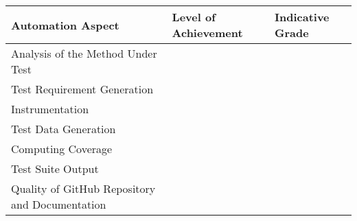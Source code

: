 \begin{tabular}{p{10em}p{15em}p{5em}}

    \toprule

    {\bf Automation Aspect} & {\bf Level of Achievement} & {\bf Indicative Grade} \\

    \midrule

    Analysis of the Method Under Test \\

    \midrule

    Test Requirement Generation \\

    \midrule

    Instrumentation \\

    \midrule

    Test Data Generation \\

    \midrule

    Computing Coverage \\

    \midrule

    Test Suite Output \\

    \midrule

    Quality of GitHub Repository and Documentation \\

    \bottomrule

\end{tabular}

